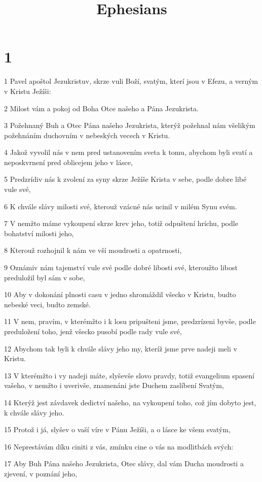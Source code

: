

\title{Ephesians}

\chapter{1}

\par 1 Pavel apoštol Jezukristuv, skrze vuli Boží, svatým, kterí jsou v Efezu, a verným v Kristu Ježíši:
\par 2 Milost vám a pokoj od Boha Otce našeho a Pána Jezukrista.
\par 3 Požehnaný Buh a Otec Pána našeho Jezukrista, kterýž požehnal nám všelikým požehnáním duchovním v nebeských vecech v Kristu.
\par 4 Jakož vyvolil nás v nem pred ustanovením sveta k tomu, abychom byli svatí a neposkvrnení pred oblicejem jeho v lásce,
\par 5 Predzrídiv nás k zvolení za syny skrze Ježíše Krista v sebe, podle dobre libé vule své,
\par 6 K chvále slávy milosti své, kterouž vzácné nás ucinil v milém Synu svém.
\par 7 V nemžto máme vykoupení skrze krev jeho, totiž odpuštení hríchu, podle bohatství milosti jeho,
\par 8 Kterouž rozhojnil k nám ve vší moudrosti a opatrnosti,
\par 9 Oznámiv nám tajemství vule své podle dobré libosti své, kteroužto libost preduložil byl sám v sobe,
\par 10 Aby v dokonání plnosti casu v jedno shromáždil všecko v Kristu, budto nebeské veci, budto zemské.
\par 11 V nem, pravím, v kterémžto i k losu pripušteni jsme, predzrízeni byvše, podle preduložení toho, jenž všecko pusobí podle rady vule své,
\par 12 Abychom tak byli k chvále slávy jeho my, kteríž jsme prve nadeji meli v Kristu.
\par 13 V kterémžto i vy nadeji máte, slyševše slovo pravdy, totiž evangelium spasení vašeho, v nemžto i uverivše, znamenáni jste Duchem zaslíbení Svatým,
\par 14 Kterýž jest závdavek dedictví našeho, na vykoupení toho, což jím dobyto jest, k chvále slávy jeho.
\par 15 Protož i já, slyšev o vaší víre v Pánu Ježíši, a o lásce ke všem svatým,
\par 16 Neprestávám díku ciniti z vás, zmínku cine o vás na modlitbách svých:
\par 17 Aby Buh Pána našeho Jezukrista, Otec slávy, dal vám Ducha moudrosti a zjevení, v poznání jeho,
